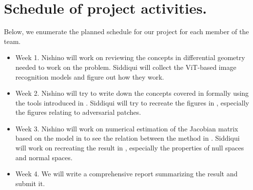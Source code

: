 \documentclass[
	12pt, %
]{../Template/fphw}
\begin{document}
\section*{Schedule of project activities.}
Below, we enumerate the planned schedule for our project for each member of the team. 
\begin{itemize}
    \item {Week 1.} Nishino will work on reviewing the concepts in differential geometry needed to work on the problem. Siddiqui will collect the ViT-based image recognition models and figure out how they work.
    \item {Week 2.} Nishino will try to write down the concepts covered in \cite{salman2024intriguing} formally using the tools introduced in \cite{geshkovski2024mathematical}. Siddiqui will try to recreate the figures in \cite{naseer2021intriguing}, especially the figures relating to adversarial patches.
    \item{Week 3.} Nishino will work on numerical estimation of the Jacobian matrix based on the model in \cite{geshkovski2024mathematical} to see the relation between the method in \cite{salman2024intriguing}. Siddiqui will work on recreating the result in \cite{salman2024intriguing}, especially the properties of null spaces and normal spaces.
    \item{Week 4.} We will write a comprehensive report summarizing the result and submit it.
\end{itemize}



\end{document}
